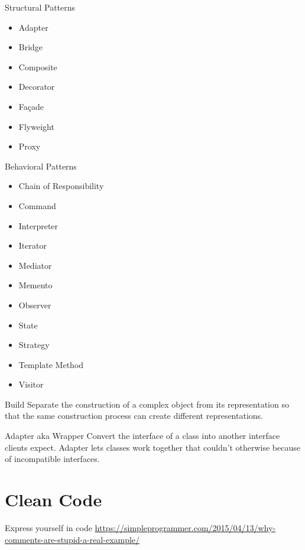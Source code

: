 \documentclass{beamer}
\begin{document}
\begin{frame}{Structural Patterns}
\begin{itemize}
  \item Adapter
  \item Bridge
  \item Composite
  \item Decorator
  \item Façade
  \item Flyweight
  \item Proxy
\end{itemize}
\end{frame}

\begin{frame}{Behavioral Patterns}
\begin{itemize}
  \item Chain of Responsibility
  \item Command
  \item Interpreter
  \item Iterator
  \item Mediator
  \item Memento
  \item Observer
  \item State
  \item Strategy
  \item Template Method
  \item Visitor
\end{itemize}
\end{frame}

\begin{frame}{Build}
Separate the construction of a complex object from its representation so that
the same construction process can create different representations.
\end{frame}

\begin{frame}{Adapter aka Wrapper}
Convert the interface of a class into another interface clients expect. Adapter
lets classes work together that couldn't otherwise because of incompatible
interfaces.
\end{frame}

\part{Clean Code}
\begin{frame}{Express yourself in code}
\url{https://simpleprogrammer.com/2015/04/13/why-comments-are-stupid-a-real-example/}
\end{frame}
\end{document}

